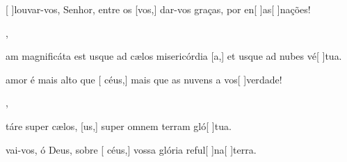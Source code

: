 {    {\item {}[ ]{lou}var-vos, Senhor, entre os [vos,] dar-vos graças, por en[ ]{as}[ ]{na}ções!~\Antiphona},
  {\item {}am magnificáta est usque ad cælos misericórdia [a,] et usque ad nubes vé[ ]{tu}a.~\Antiphona}%
    {\item {} amor é mais alto que [ céus,] mais que as nuvens a vos[ ]{ver}{da}de!~\Antiphona},
  {\item {}táre super cælos, [us,] super omnem terram gló[ ]{tu}a.~\Antiphona}%
    {\item {}vai-vos, ó Deus, sobre [ céus,] vossa glória reful[ ]{na}[ ]{ter}ra.~\Antiphona}
}